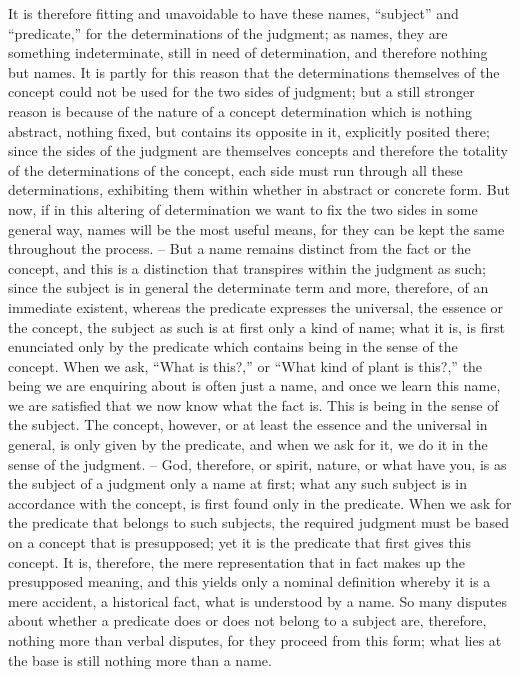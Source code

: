 It is therefore fitting and unavoidable to have these names, “subject”
and “predicate,” for the determinations of the judgment; as names, they
are something indeterminate, still in need of determination, and therefore
nothing but names. It is partly for this reason that the determinations
themselves of the concept could not be used for the two sides of judgment;
but a still stronger reason is because of the nature of a concept determination
which is nothing abstract, nothing fixed, but contains its opposite in it,
explicitly posited there; since the sides of the judgment are themselves
concepts and therefore the totality of the determinations of the concept,
each side must run through all these determinations, exhibiting them
within whether in abstract or concrete form. But now, if in this altering of
determination we want to fix the two sides in some general way, names will
be the most useful means, for they can be kept the same throughout the
process. – But a name remains distinct from the fact or the concept, and this
is a distinction that transpires within the judgment as such; since the subject
is in general the determinate term and more, therefore, of an immediate
existent, whereas the predicate expresses the universal, the essence or the
concept, the subject as such is at first only a kind of name; what it is, is first
enunciated only by the predicate which contains being in the sense of the
concept. When we ask, “What is this?,” or “What kind of plant is this?,”
the being we are enquiring about is often just a name, and once we learn
this name, we are satisfied that we now know what the fact is. This is being
in the sense of the subject. The concept, however, or at least the essence and
the universal in general, is only given by the predicate, and when we ask for
it, we do it in the sense of the judgment. – God, therefore, or spirit, nature,
or what have you, is as the subject of a judgment only a name at first; what
any such subject is in accordance with the concept, is first found only in
the predicate. When we ask for the predicate that belongs to such subjects,
the required judgment must be based on a concept that is presupposed; yet
it is the predicate that first gives this concept. It is, therefore, the mere
representation that in fact makes up the presupposed meaning, and this
yields only a nominal definition whereby it is a mere accident, a historical
fact, what is understood by a name. So many disputes about whether a
predicate does or does not belong to a subject are, therefore, nothing more
than verbal disputes, for they proceed from this form; what lies at the base
is still nothing more than a name.

